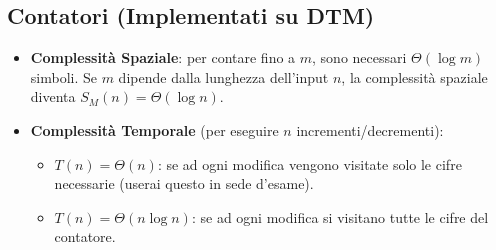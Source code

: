 \subsection{Contatori (Implementati su DTM)}
\begin{itemize}
    \item \textbf{Complessità Spaziale}: per contare fino a $m$, sono necessari $\Theta(\log m)$ simboli. Se $m$ dipende dalla lunghezza dell'input $n$, la complessità spaziale diventa $S_M(n) = \Theta(\log n)$.
    \item \textbf{Complessità Temporale} (per eseguire $n$ incrementi/decrementi):
    \begin{itemize}
        \item $T(n) = \Theta(n)$: se ad ogni modifica vengono visitate solo le cifre necessarie (userai questo in sede d'esame).
        \item $T(n) = \Theta(n \log n)$: se ad ogni modifica si visitano tutte le cifre del contatore.
    \end{itemize}
\end{itemize}